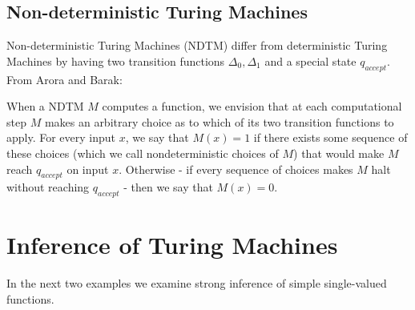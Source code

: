 \documentclass[11pt]{article}
\begin{document}
\subsection{Non-deterministic Turing Machines} 

Non-deterministic Turing Machines (NDTM) differ from deterministic Turing Machines by having two transition functions $ \Delta_0, \Delta_1 $ and a special state $ q_{accept} $. From Arora and Barak:

\begin{displayquote}
When a NDTM $M$ computes a function, we envision that at each computational step $ M $ makes an arbitrary choice as to which of its two transition functions to apply. For every input $ x $, we say that $ M(x) = 1 $ if there exists some sequence of these choices (which we call nondeterministic choices of $ M $) that would make $ M $ reach $ q_{accept} $ on input $ x $. Otherwise - if every sequence of choices makes $ M $ halt without reaching $ q_{accept} $ - then we say that $ M(x) = 0 $.
\end{displayquote}


\section{Inference of Turing Machines} 
 
 In the next two examples we examine strong inference of simple single-valued functions. \\
 
\end{document}
